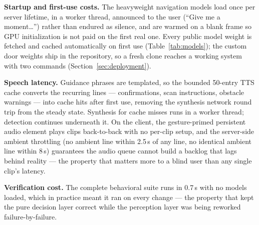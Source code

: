 \textbf{Startup and first-use costs.} The heavyweight navigation models load once
per server lifetime, in a worker thread, announced to the user (``Give me a
moment\ldots'') rather than endured as silence, and are warmed on a blank frame so
GPU initialization is not paid on the first real one. Every public model weight is
fetched and cached automatically on first use (Table~\ref{tab:models}); the custom
door weights ship in the repository, so a fresh clone reaches a working system
with two commands (Section~\ref{sec:deployment}).

\textbf{Speech latency.} Guidance phrases are templated, so the bounded 50-entry
TTS cache converts the recurring lines --- confirmations, scan instructions,
obstacle warnings --- into cache hits after first use, removing the synthesis
network round trip from the steady state. Synthesis for cache misses runs in a
worker thread; detection continues underneath it. On the client, the
gesture-primed persistent audio element plays clips back-to-back with no per-clip
setup, and the server-side ambient throttling (no ambient line within 2.5\,s of
any line, no identical ambient line within 8\,s) guarantees the audio queue cannot
build a backlog that lags behind reality --- the property that matters more to a
blind user than any single clip's latency.

\textbf{Verification cost.} The complete behavioral suite runs in 0.7\,s with no
models loaded, which in practice meant it ran on every change --- the property
that kept the pure decision layer correct while the perception layer was being
reworked failure-by-failure.